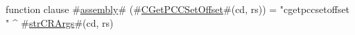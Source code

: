 function clause #\hyperref[sailMIPSzassembly]{assembly}# (#\hyperref[sailMIPSzCGetPCCSetOffset]{CGetPCCSetOffset}#(cd, rs)) = "cgetpccsetoffset " ^ #\hyperref[sailMIPSzstrCRArgs]{strCRArgs}#(cd, rs)
